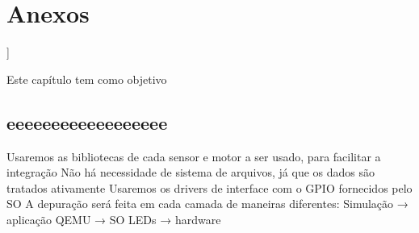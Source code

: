 \chapter{Anexos}]

\label{CAP9}


Este capítulo tem como objetivo 


\section{eeeeeeeeeeeeeeeeee}\label{Sub:equa}

Usaremos as bibliotecas de cada sensor e motor a ser usado, para facilitar a integração
Não há necessidade de sistema de arquivos, já que os dados são tratados ativamente
Usaremos os drivers de interface com o GPIO fornecidos pelo SO
A depuração será feita em cada camada de maneiras diferentes: 
Simulação → aplicação 
QEMU → SO 
LEDs → hardware 
